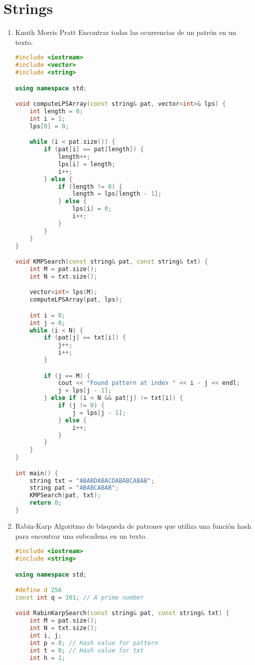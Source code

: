 \section{Strings}
\begin{enumerate}
\item Knuth Morris Pratt
Encontrar todas las ocurrencias de un patrón en un texto.
	\begin{lstlisting}[language=C++]
#include <iostream>
#include <vector>
#include <string>

using namespace std;

void computeLPSArray(const string& pat, vector<int>& lps) {
    int length = 0;
    int i = 1;
    lps[0] = 0;

    while (i < pat.size()) {
        if (pat[i] == pat[length]) {
            length++;
            lps[i] = length;
            i++;
        } else {
            if (length != 0) {
                length = lps[length - 1];
            } else {
                lps[i] = 0;
                i++;
            }
        }
    }
}

void KMPSearch(const string& pat, const string& txt) {
    int M = pat.size();
    int N = txt.size();

    vector<int> lps(M);
    computeLPSArray(pat, lps);

    int i = 0;
    int j = 0;
    while (i < N) {
        if (pat[j] == txt[i]) {
            j++;
            i++;
        }

        if (j == M) {
            cout << "Found pattern at index " << i - j << endl;
            j = lps[j - 1];
        } else if (i < N && pat[j] != txt[i]) {
            if (j != 0) {
                j = lps[j - 1];
            } else {
                i++;
            }
        }
    }
}

int main() {
    string txt = "ABABDABACDABABCABAB";
    string pat = "ABABCABAB";
    KMPSearch(pat, txt);
    return 0;
}

	\end{lstlisting}
	\item Rabin-Karp 
	Algoritmo de búsqueda de patrones que utiliza una función hash para encontrar una subcadena en un texto.
	\begin{lstlisting}[language=C++]
	#include <iostream>
#include <string>

using namespace std;

#define d 256
const int q = 101; // A prime number

void RabinKarpSearch(const string& pat, const string& txt) {
    int M = pat.size();
    int N = txt.size();
    int i, j;
    int p = 0; // Hash value for pattern
    int t = 0; // Hash value for txt
    int h = 1;


\end{lstlisting}
\end{enumerate}
